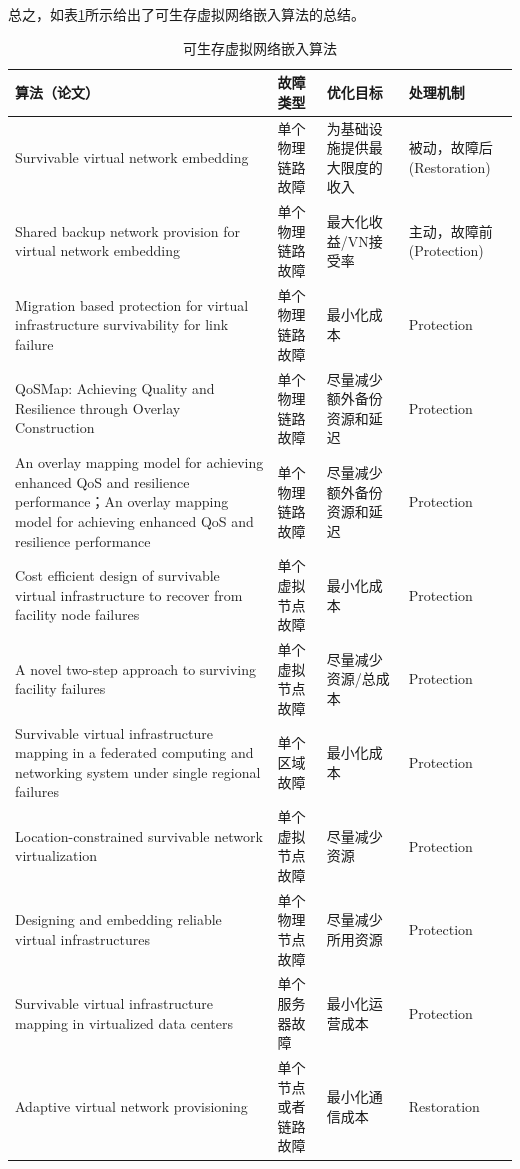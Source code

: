 总之，如表\ref{tab:survivableVirtualNetworkEmbedd}所示给出了可生存虚拟网络嵌入算法的总结。
\begin{table}[htb]
\caption{可生存虚拟网络嵌入算法}\label{tab:survivableVirtualNetworkEmbedd}
\vspace{0.5em}\centering\wuhao
\begin{tabularx}{48em}{|*{4}{>{\centering\arraybackslash}X|}}
\toprule[1.5pt]
算法（论文）   & 故障类型  & 优化目标 & 处理机制  \\
\midrule[1pt]
Survivable virtual network embedding\cite{rahman2013svne} & 单个物理链路故障 & 为基础设施提供最大限度的收入 & 被动，故障后(Restoration)\\
\hline
Shared backup network provision for virtual network embedding\cite{guo2011shared} & 单个物理链路故障 & 最大化收益/VN接受率& 主动，故障前(Protection)\\
\hline
Migration based protection for virtual infrastructure survivability for link failure\cite{yu2011migration} & 单个物理链路故障 & 最小化成本 & Protection\\
\hline
QoSMap: Achieving Quality and Resilience through Overlay Construction\cite{shamsi2009qosmap} & 单个物理链路故障 & 尽量减少额外备份资源和延迟 & Protection\\
\hline
An overlay mapping model for achieving enhanced QoS and resilience performance\cite{zhang2011overlay}；An overlay mapping model for achieving enhanced QoS and resilience performance\cite{zhang2011overlay} & 单个物理链路故障 & 尽量减少额外备份资源和延迟 & Protection\\
\hline
Cost efficient design of survivable virtual infrastructure to recover from facility node failures\cite{yu2011cost} & 单个虚拟节点故障& 最小化成本 & Protection\\
\hline
A novel two-step approach to surviving facility failures\cite{qiao2011novel} & 单个虚拟节点故障 & 尽量减少资源/总成本 & Protection\\
\hline
Survivable virtual infrastructure mapping in a federated computing and networking system under single regional failures\cite{yu2010survivable} & 单个区域故障 & 最小化成本 & Protection \\
\hline
Location-constrained survivable network virtualization\cite{hu2012location} & 单个虚拟节点故障 & 尽量减少资源 & Protection\\
\hline
Designing and embedding reliable virtual infrastructures\cite{yeow2010designing} & 单个物理节点故障 & 尽量减少所用资源 & Protection\\
\hline
Survivable virtual infrastructure mapping in virtualized data centers\cite{xu2012survivable} & 单个服务器故障 & 最小化运营成本& Protection\\
\hline
Adaptive virtual network provisioning\cite{houidi2010adaptive} & 单个节点或者链路故障 & 最小化通信成本 & Restoration\\
\bottomrule[1.5pt]
\end{tabularx}
\vspace{\baselineskip}
\end{table}

